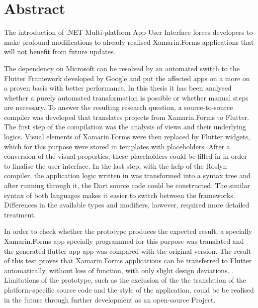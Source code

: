 \chapter*{Abstract}

The introduction of .NET Multi-platform App User Interface forces developers to make profound modifications to already realised Xamarin.Forms applications that will not benefit from future updates. 

The dependency on Microsoft can be resolved by an automated switch to the Flutter Framework developed by Google and put the affected apps on a more on a proven basis with better performance. In this thesis it has been analysed whether a purely automated transformation is possible or whether manual steps are necessary.  To answer the resulting research question, a source-to-source compiler was developed that translates projects from Xamarin.Forms to Flutter. The first step of the compilation was the analysis of views and their underlying logics.  Visual elements of Xamarin.Forms were then replaced by Flutter widgets, which for this purpose were stored in templates with placeholders. After a conversion of the visual properties, these placeholders could be filled in in order to finalise the user interface. 
In the last step, with the help of the Roslyn compiler, the application logic written in \Csharp{} was transformed into a syntax tree and after running through it, the Dart source code could be constructed. The similar syntax of both languages makes it easier to switch between the frameworks.  Differences in the available types and modifiers, however, required more detailed treatment.

In order to check whether the prototype produces the expected result, a specially Xamarin.Forms app specially programmed for this purpose was translated and the generated flutter app app was compared with the original version. The result of this test proves that Xamarin.Forms applications can be transferred to Flutter automatically, without loss of function, with only slight design deviations. . Limitations of the prototype, such as the exclusion of the the translation of the platform-specific source code and the style of the application, could be be realised in the future through further development as an open-source Project.

